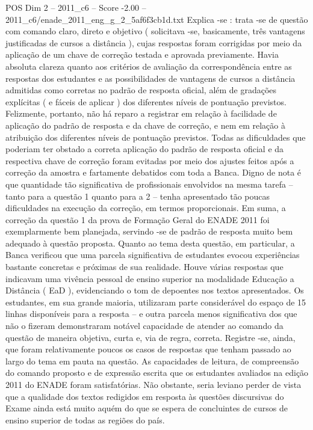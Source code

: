 \begin{textsample}{POS Dim 2 – 2011\_c6 – Score -2.00 – 2011\_c6/enade\_2011\_eng\_g\_2\_5af6f3cb1d.txt}
Explica -se : trata -se de questão com comando claro, direto e objetivo ( solicitava -se, basicamente, três vantagens justificadas de cursos a distância ), cujas respostas foram corrigidas por meio da aplicação de um chave de correção testada e aprovada previamente.
Havia absoluta clareza quanto aos critérios de avaliação da correspondência entre as respostas dos estudantes e as possibilidades de vantagens de cursos a distância admitidas como corretas no padrão de resposta oficial, além de gradações explícitas ( e fáceis de aplicar ) dos diferentes níveis de pontuação previstos.
Felizmente, portanto, não há reparo a registrar em relação à facilidade de aplicação do padrão de resposta e da chave de correção, e nem em relação à atribuição dos diferentes níveis de pontuação previstos.
Todas as dificuldades que poderiam ter obstado a correta aplicação do padrão de resposta oficial e da respectiva chave de correção foram evitadas por meio dos ajustes feitos após a correção da amostra e fartamente debatidos com toda a Banca.
Digno de nota é que quantidade tão significativa de profissionais envolvidos na mesma tarefa – tanto para a questão 1 quanto para a 2 – tenha apresentado tão poucas dificuldades na execução da correção, em termos proporcionais.
Em suma, a correção da questão 1 da prova de Formação Geral do ENADE 2011 foi exemplarmente bem planejada, servindo -se de padrão de resposta muito bem adequado à questão proposta.
Quanto ao tema desta questão, em particular, a Banca verificou que uma parcela significativa de estudantes evocou experiências bastante concretas e próximas de sua realidade.
Houve várias respostas que indicavam uma vivência pessoal de ensino superior na modalidade Educação a Distância ( EaD ), evidenciando o tom de depoentes nos textos apresentados.
Os estudantes, em sua grande maioria, utilizaram parte considerável do espaço de 15 linhas disponíveis para a resposta – e outra parcela menos significativa dos que não o fizeram demonstraram notável capacidade de atender ao comando da questão de maneira objetiva, curta e, via de regra, correta.
Registre -se, ainda, que foram relativamente poucos os casos de respostas que tenham passado ao largo do tema em pauta na questão.
As capacidades de leitura, de compreensão do comando proposto e de expressão escrita que os estudantes avaliados na edição 2011 do ENADE foram satisfatórias.
Não obstante, seria leviano perder de vista que a qualidade dos textos redigidos em resposta às questões discursivas do Exame ainda está muito aquém do que se espera de concluintes de cursos de ensino superior de todas as regiões do país.

\end{textsample}
